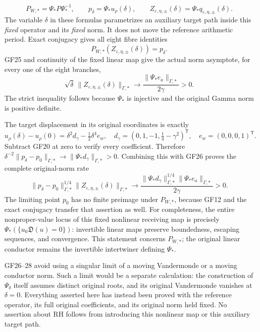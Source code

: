 \documentclass[11pt]{article}
\begin{document}
\[
 P_{W,*}=\Psi_*P\Psi_*^{-1},\qquad
 p_\delta=\Psi_*u_\rho(\delta),\qquad
 Z_{\varepsilon,\eta,\pm}(\delta)
              =\Psi_*q_{\varepsilon,\eta,\pm}(\delta).
\]
The variable $\delta$ in these formulas parametrizes an auxiliary
target path inside this \emph{fixed} operator and its \emph{fixed}
norm. It does not move the reference arithmetic period. Exact
conjugacy gives all eight fibre identities
\[
 P_{W,*}(Z_{\varepsilon,\eta,\pm}(\delta))=p_\delta.
\]
GF25 and continuity of the fixed linear map give the actual norm
asymptote, for every one of the eight branches,
\begin{equation}
 \sqrt\delta\,\|Z_{\varepsilon,\eta,\pm}(\delta)\|_{\Gamma,*}
       \longrightarrow\frac{\|\Psi_*e_a\|_{\Gamma,*}}{2\gamma}>0.
 \tag{GF26}
\end{equation}
The strict inequality follows because $\Psi_*$ is injective and
the original Gamma norm is positive definite.

The target displacement in its original coordinates is exactly
\begin{equation}
 u_\rho(\delta)-u_\rho(0)
 =\delta^2 d_\gamma-\tfrac12\delta^4e_w,
 \quad d_\gamma=(0,1,-1,\tfrac14-\gamma^2)^{\mathsf T},
 \quad e_w=(0,0,0,1)^{\mathsf T}.\tag{GF27}
\end{equation}
Subtract GF20 at zero to verify every coefficient. Therefore
$\delta^{-2}\|p_\delta-p_0\|_{\Gamma,*}
\to\|\Psi_*d_\gamma\|_{\Gamma,*}>0$.
Combining this with GF26 proves the complete original-norm rate
\begin{equation}
 \boxed{\quad
 \|p_\delta-p_0\|_{\Gamma,*}^{1/4}
 \|Z_{\varepsilon,\eta,\pm}(\delta)\|_{\Gamma,*}
 \longrightarrow
 \frac{\|\Psi_*d_\gamma\|_{\Gamma,*}^{1/4}
       \|\Psi_*e_a\|_{\Gamma,*}}{2\gamma}>0.
 \quad}\tag{GF28}
\end{equation}
The limiting point $p_0$ has no finite preimage under $P_{W,*}$,
because GF12 and the exact conjugacy transfer that assertion as
well. For completeness, the entire nonproper-value locus of this
fixed nonlinear receiving map is precisely
$\Psi_*(\{u_0\mathfrak D(u)=0\})$: invertible linear maps preserve
boundedness, escaping sequences, and convergence. This statement
concerns $P_{W,*}$; the original linear conductor remains the
invertible intertwiner defining $\Psi_*$.

GF26--28 avoid using a singular limit of a moving Vandermonde or a
moving conductor norm. Such a limit would be a separate calculation:
the construction of $\Psi_\delta$ itself assumes distinct original
roots, and its original Vandermonde vanishes at $\delta=0$.
Everything asserted here has instead been proved with the reference
operator, its full original coefficients, and its original norm held
fixed. No assertion about RH follows from introducing this nonlinear
map or this auxiliary target path.
\end{document}
